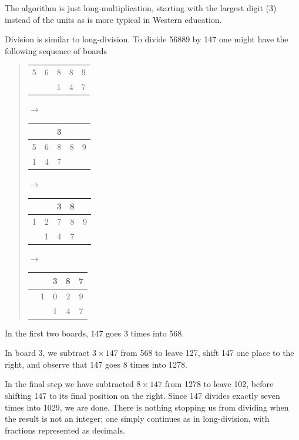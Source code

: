The algorithm is just long-multiplication, starting with the largest digit (3) instead of the units as is more typical in Western education.\smallbreak
  
Division is similar to long-division. To divide 56889 by 147 one might have the following sequence of boards
\begin{quote}
  \begin{tabular}{|c|c|c|c|c|}
	  \hline
	  &&&&\\\hline
	  5&6&8&8&9\\\hline
	  &&1&4&7\\\hline
  \end{tabular} 
 	$\longrightarrow$
  \begin{tabular}{|c|c|c|c|c|}
	  \hline
	  &&3&&\\\hline
	  5&6&8&8&9\\\hline
	  1&4&7&&\\\hline
  \end{tabular}
  $\longrightarrow$
  \begin{tabular}{|c|c|c|c|c|}
	  \hline
	  &&3&8&\\\hline
	  1&2&7&8&9\\\hline
	  &1&4&7&\\\hline
  \end{tabular}
  $\longrightarrow$
  \begin{tabular}{|c|c|c|c|c|}
	  \hline
	  &&3&8&7\\\hline
	  &1&0&2&9\\\hline
	  &&1&4&7\\\hline
  \end{tabular}
\end{quote}
In the first two boards, 147 goes 3 times into 568.\par
In board 3, we subtract $3\times 147$ from 568 to leave 127, shift 147 one place to the right, and observe that 147 goes 8 times into 1278.\par
In the final step we have subtracted $8\times 147$ from 1278 to leave 102, before shifting 147 to its final position on the right. Since 147 divides exactly seven times into 1029, we are done.\smallbreak
There is nothing stopping us from dividing when the result is not an integer; one simply continues as in long-division, with fractions represented as decimals.
\goodbreak



